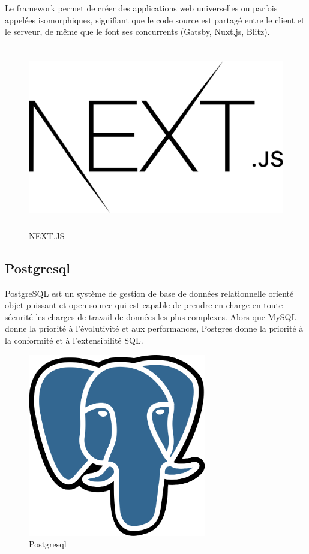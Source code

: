 Le framework permet de créer des applications web universelles ou parfois appelées isomorphiques, signifiant que le code source est partagé entre le client et le serveur, de même que le font ses concurrents (Gatsby, Nuxt.js, Blitz).

\begin{figure}[!h]
\begin{center}
\includegraphics[height=8cm]{Nextjs.svg.png}
\end{center}
\caption{NEXT.JS}
\end{figure}

\subsection{Postgresql}

PostgreSQL est un système de gestion de base de données relationnelle orienté objet puissant et open source qui est capable de prendre en charge en toute sécurité les charges de travail de données les plus complexes. Alors que MySQL donne la priorité à l'évolutivité et aux performances, Postgres donne la priorité à la conformité et à l'extensibilité SQL.

\begin{figure}[!h]
\begin{center}
\includegraphics[height=8cm]{Postgresql.svg.png}
\end{center}
\caption{Postgresql}
\end{figure}



